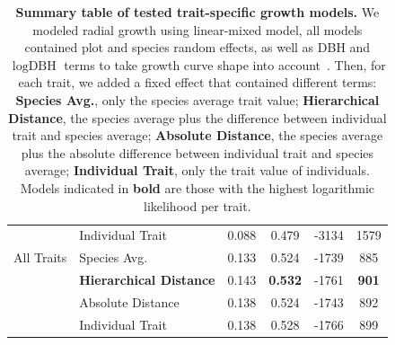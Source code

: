 \begin{table}[!pt]
\begin{center}
\begin{tabular}{llcccc}
		            & Individual Trait & 0.088 & 0.479 & -3134 & 1579 \\
		  \cline{2-6}
		  All Traits & Species Avg. & 0.133 & 0.524 & -1739 & 885 \\ 
		             & \textbf{Hierarchical Distance} & 0.143 & \textbf{0.532} & -1761 & \textbf{901} \\
		             & Absolute Distance & 0.138 & 0.524 & -1743 & 892 \\
		             & Individual Trait & 0.138 & 0.528 & -1766 & 899 \\ 
		   \hline
		\end{tabular}
		\caption{\textbf{Summary table of tested trait-specific growth models.} We modeled radial growth using linear-mixed model, all models contained plot and species random effects, as well as DBH and $\log\text{DBH}$ terms to take growth curve shape into account~\citep{herault_functional_2011}. Then, for each trait, we added a fixed effect that contained different terms: \textbf{Species Avg.}, only the species average trait value; \textbf{Hierarchical Distance}, the species average plus the difference between individual trait and species average; \textbf{Absolute Distance}, the species average plus the absolute difference between individual trait and species average; \textbf{Individual Trait}, only the trait value of individuals. Models indicated in \textbf{bold} are those with the highest logarithmic likelihood per trait.}
		\label{tab:growth_mod}
	\end{center}
\end{table}

